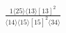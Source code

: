 \documentclass[varwidth, border=5pt]{standalone}
\begin{document}
\begin{my}
$\begin{gathered}
\scriptscriptstyle\frac{1⟨25⟩⟨13⟩[13]^2}{⟨14⟩⟨15⟩[15]^2⟨34⟩}
\end{gathered}$
\end{my}
\end{document}

